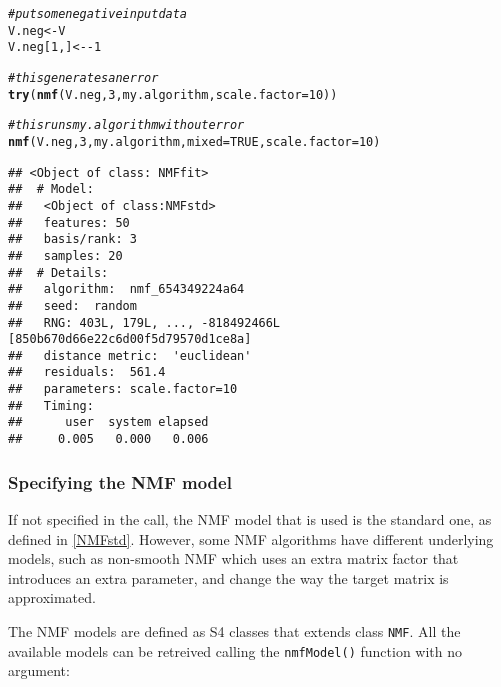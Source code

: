 \documentclass[a4paper]{article}\usepackage[]{graphicx}\usepackage[]{color}
\makeatletter
\newcommand{\hlnum}[1]{\textcolor[rgb]{0.686,0.059,0.569}{#1}}%
\newcommand{\hlcom}[1]{\textcolor[rgb]{0.678,0.584,0.686}{\textit{#1}}}%
\newcommand{\hlopt}[1]{\textcolor[rgb]{0,0,0}{#1}}%
\newcommand{\hlstd}[1]{\textcolor[rgb]{0.345,0.345,0.345}{#1}}%
\newcommand{\hlkwb}[1]{\textcolor[rgb]{0.69,0.353,0.396}{#1}}%
\newcommand{\hlkwc}[1]{\textcolor[rgb]{0.333,0.667,0.333}{#1}}%
\newcommand{\hlkwd}[1]{\textcolor[rgb]{0.737,0.353,0.396}{\textbf{#1}}}%
\newenvironment{kframe}{%
 \def\at@end@of@kframe{}%
 \ifinner\ifhmode%
  \def\at@end@of@kframe{\end{minipage}}%
  \begin{minipage}{\columnwidth}%
 \fi\fi%
 \def\FrameCommand##1{\hskip\@totalleftmargin \hskip-\fboxsep
 \colorbox{shadecolor}{##1}\hskip-\fboxsep
     \hskip-\linewidth \hskip-\@totalleftmargin \hskip\columnwidth}%
 \MakeFramed {\advance\hsize-\width
   \@totalleftmargin\z@ \linewidth\hsize
   \@setminipage}}%
 {\par\unskip\endMakeFramed%
 \at@end@of@kframe}
\newenvironment{knitrout}{}{} %
\let\code=\texttt
\renewcommand{\cite}[1]{\parencite{#1}}
\makeatother
\begin{document}
\begin{knitrout}
\color{fgcolor}\begin{kframe}
\begin{alltt}
\hlcom{# put some negative input data}
\hlstd{V.neg} \hlkwb{<-} \hlstd{V}
\hlstd{V.neg[}\hlnum{1}\hlstd{, ]} \hlkwb{<-} \hlopt{-}\hlnum{1}

\hlcom{# this generates an error}
\hlkwd{try}\hlstd{(}\hlkwd{nmf}\hlstd{(V.neg,} \hlnum{3}\hlstd{, my.algorithm,} \hlkwc{scale.factor} \hlstd{=} \hlnum{10}\hlstd{))}
\end{alltt}


{\ttfamily\noindent\bfseries\color{errorcolor}{\#\# Error: NMF::nmf - Input matrix x contains some negative entries.}}\begin{alltt}
\hlcom{# this runs my.algorithm without error}
\hlkwd{nmf}\hlstd{(V.neg,} \hlnum{3}\hlstd{, my.algorithm,} \hlkwc{mixed} \hlstd{=} \hlnum{TRUE}\hlstd{,} \hlkwc{scale.factor} \hlstd{=} \hlnum{10}\hlstd{)}
\end{alltt}
\begin{verbatim}
## <Object of class: NMFfit>
##  # Model:
##   <Object of class:NMFstd>
##   features: 50 
##   basis/rank: 3 
##   samples: 20 
##  # Details:
##   algorithm:  nmf_654349224a64 
##   seed:  random 
##   RNG: 403L, 179L, ..., -818492466L [850b670d66e22c6d00f5d79570d1ce8a]
##   distance metric:  'euclidean' 
##   residuals:  561.4 
##   parameters: scale.factor=10 
##   Timing:
##      user  system elapsed 
##     0.005   0.000   0.006
\end{verbatim}
\end{kframe}
\end{knitrout}


\subsubsection{Specifying the NMF model}
If not specified in the call, the NMF model that is used is the standard one, as defined in \cref{NMFstd}. 
However, some NMF algorithms have different underlying models, such as non-smooth NMF \cite{Pascual-Montano2006} which uses an extra matrix factor that introduces an extra parameter, and change the way the target matrix is approximated.

The NMF models are defined as S4 classes that extends class \code{NMF}. All the available models can be retreived calling the \code{nmfModel()} function with no 
argument:
\end{document}
